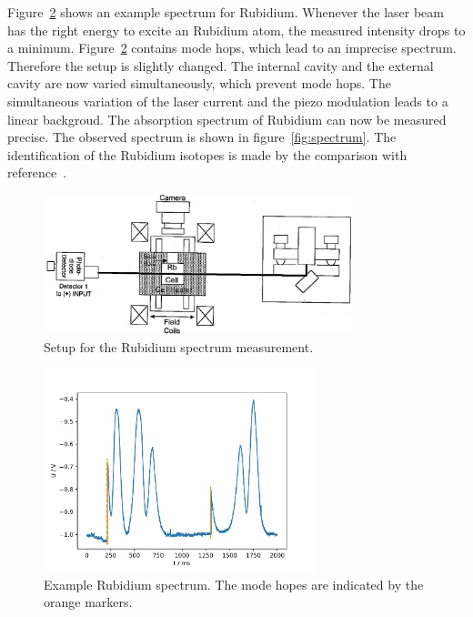 Figure~\ref{fig:example} shows an example spectrum for Rubidium. Whenever
the laser beam has the right energy to excite an Rubidium atom, the
measured intensity drops to a minimum. Figure~\ref{fig:example} contains
mode hops, which lead to an imprecise spectrum.
Therefore the setup is slightly changed. The internal cavity and the external cavity
are now varied simultaneously, which prevent mode hops.
The simultaneous variation of the laser current and the piezo modulation leads to a linear backgroud.
The absorption spectrum of Rubidium can now be measured precise. The observed spectrum
is shown in figure~\ref{fig:spectrum}. The identification of the Rubidium isotopes
is made by the comparison with reference~\cite{anleitung}.

\begin{figure}
  \centering
  \includegraphics[width=0.8\textwidth]{Pics/setup_spectrum.png}
  \caption{Setup for the Rubidium spectrum measurement.\cite{anleitung}}
  \label{fig:setup_spectrum}
\end{figure}

\begin{figure}
  \centering
  \includegraphics[width=0.7\textwidth]{Pics/example_spectrum_hop.pdf}
  \caption{Example Rubidium spectrum. The mode hopes are indicated by the orange markers.}
  \label{fig:example}
\end{figure}

